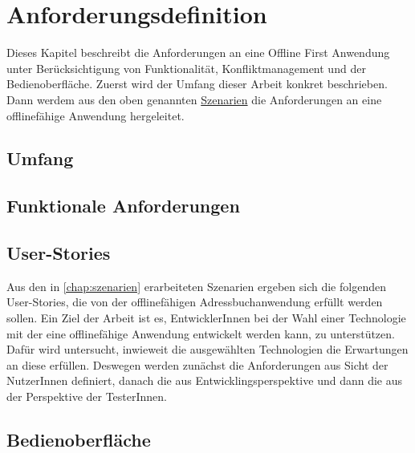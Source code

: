 \chapter{\label{chap:anforderungen}Anforderungsdefinition}
Dieses Kapitel beschreibt die Anforderungen an eine Offline First Anwendung unter Berücksichtigung von Funktionalität, Konfliktmanagement und der Bedienoberfläche.
Zuerst wird der Umfang dieser Arbeit konkret beschrieben. Dann werdem aus den oben genannten \hyperref[chap:szenarien]{Szenarien} die Anforderungen an eine offlinefähige Anwendung hergeleitet.
%
%
\section{Umfang}

%
%
\section{Funktionale Anforderungen}

%
%
\section{User-Stories}
Aus den in \autoref{chap:szenarien} erarbeiteten Szenarien ergeben sich die folgenden User-Stories, die von der offlinefähigen Adressbuchanwendung erfüllt werden sollen.
Ein Ziel der Arbeit ist es, EntwicklerInnen bei der Wahl einer Technologie mit der eine offlinefähige Anwendung entwickelt werden kann, zu unterstützen. Dafür wird untersucht, inwieweit die ausgewählten Technologien die Erwartungen an diese erfüllen.
Deswegen werden zunächst die Anforderungen aus Sicht der NutzerInnen definiert, danach die aus Entwicklingsperspektive und dann die aus der Perspektive der TesterInnen.



%
%
\section{Bedienoberfläche}
